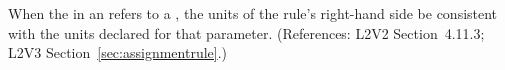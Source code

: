 When the  in an \AssignmentRule refers to a \Parameter, the
units of the rule's right-hand side  be consistent with the units
declared for that parameter.  (References: L2V2 Section~4.11.3;
L2V3 Section~\ref{sec:assignmentrule}.)
